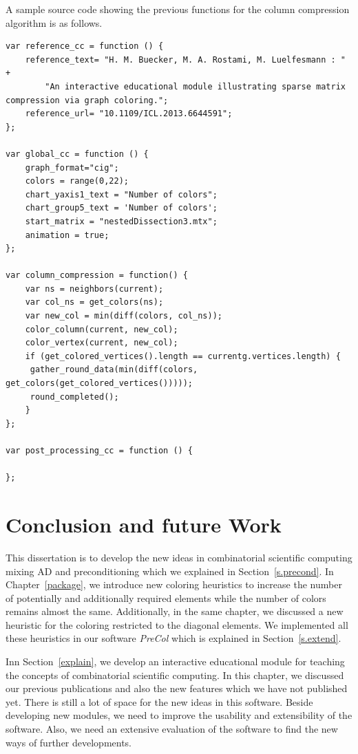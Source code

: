 \documentclass[12pt, twoside,a4paper,toc=bibliography]{scrbook}
\newcommand{\secref}[1]{Section~\protect\ref{#1}}
\begin{document}
A sample source code showing the previous functions for the column compression algorithm is as follows.
\begin{lstlisting}
var reference_cc = function () {
    reference_text= "H. M. Buecker, M. A. Rostami, M. Luelfesmann : " +
        "An interactive educational module illustrating sparse matrix compression via graph coloring.";
    reference_url= "10.1109/ICL.2013.6644591";
};

var global_cc = function () {
    graph_format="cig";
    colors = range(0,22);
    chart_yaxis1_text = "Number of colors";
    chart_group5_text = 'Number of colors';
    start_matrix = "nestedDissection3.mtx";
    animation = true;
};

var column_compression = function() {
    var ns = neighbors(current);
    var col_ns = get_colors(ns);
    var new_col = min(diff(colors, col_ns));
    color_column(current, new_col);
    color_vertex(current, new_col);
    if (get_colored_vertices().length == currentg.vertices.length) {
     gather_round_data(min(diff(colors, get_colors(get_colored_vertices()))));
     round_completed();
    }
};

var post_processing_cc = function () {

};
\end{lstlisting}

\chapter{Conclusion and future Work}
\label{conc}
This dissertation is to develop the new ideas in combinatorial scientific computing mixing AD and preconditioning which we explained in \secref{s.precond}.
In Chapter~\ref{package}, we introduce new coloring heuristics
to increase the number of potentially and additionally required elements
while the number of colors remains almost the same.
Additionally, in the same chapter,
we discussed a new heuristic for the coloring restricted to the diagonal elements.
We implemented all these heuristics in our software \textit{PreCol} which 
is explained in \secref{s.extend}.

Inn \secref{explain}, we develop an interactive educational module 
for teaching the concepts of combinatorial scientific computing. 
In this chapter, we discussed our previous publications
\cite{2013:05,2014:01,2014:02,2014:09,2015:3} and also the new features which 
we have not published yet. There is still a lot of space 
for the new ideas in this software. Beside developing new modules,
we need to improve the usability and extensibility of the software.
Also, we need an extensive evaluation of the software to find
the new ways of further developments.
\end{document}
